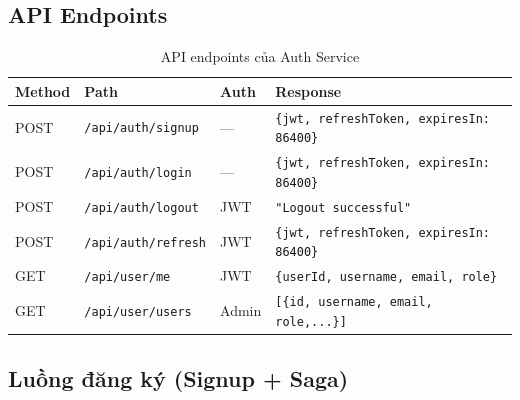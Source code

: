 \documentclass[12pt,a4paper]{report}
\begin{document}
\subsection{API Endpoints}

\begin{table}[H]
\centering
\caption{API endpoints của Auth Service}
\label{tab:authapi}
\begin{tabularx}{\textwidth}{lllX}
\toprule
\textbf{Method} & \textbf{Path} & \textbf{Auth} & \textbf{Response} \\
\midrule
POST & \texttt{/api/auth/signup}  & --- & \texttt{\{jwt, refreshToken, expiresIn: 86400\}} \\
POST & \texttt{/api/auth/login}   & --- & \texttt{\{jwt, refreshToken, expiresIn: 86400\}} \\
POST & \texttt{/api/auth/logout}  & JWT & \texttt{"Logout successful"} \\
POST & \texttt{/api/auth/refresh} & JWT & \texttt{\{jwt, refreshToken, expiresIn: 86400\}} \\
GET  & \texttt{/api/user/me}      & JWT & \texttt{\{userId, username, email, role\}} \\
GET  & \texttt{/api/user/users}   & Admin & \texttt{[\{id, username, email, role,...\}]} \\
\bottomrule
\end{tabularx}
\end{table}

\subsection{Luồng đăng ký (Signup + Saga)}
\end{document}
